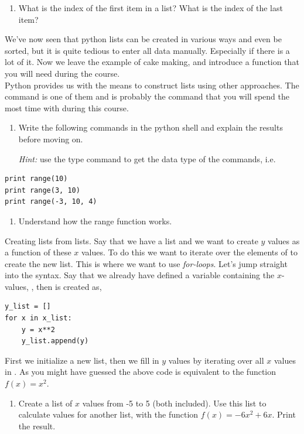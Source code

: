 \documentclass{article}
\begin{document}
\begin{enumerate}[resume]
  \item What is the index of the first item in a list? What is the index of
    the last item?

\end{enumerate}

We've now seen that python lists can be created in various ways and even be
sorted, but it is quite tedious to enter all data manually. Especially if
there is a lot of it. Now we leave the example of cake making, and introduce a function that you will need during the course. \\

Python provides us with the means to construct
lists using other approaches.
The  command is one of them and is probably the
command that you will spend the most time with during this course.

\begin{enumerate}[resume]
  \item Write the following commands in the python shell and explain the results
    before moving on.

    {\em Hint:} use the type command to get the data type of the commands,
    i.e. 
\end{enumerate}


\begin{lstlisting}
print range(10)
print range(3, 10)
print range(-3, 10, 4)
\end{lstlisting}

\begin{enumerate}[resume]
 \item Understand how the range function works.
\end{enumerate}


Creating lists from lists. Say that we have a list 
and we want to create $y$ values as a function of these $x$ values.
To do this we want to iterate over the elements of  to create the new list.
This is where we want to use {\em for-loops}.
Let's jump straight into the syntax. Say that we already
have defined a variable containing the $x$-values, ,
then  is created as,

\begin{lstlisting}
y_list = []
for x in x_list:
    y = x**2
    y_list.append(y)
\end{lstlisting}

First we initialize a new list,
then we fill in $y$ values by iterating over
all $x$ values in .
As you might have guessed the above code is equivalent to 
the function $f(x) = x^2$.\\
\begin{enumerate}[resume]
  \item Create a list of $x$ values from -5 to 5 (both included). Use this list
    to calculate values for another list, with the function $f(x) = -6x^2 + 6x$.
    Print the result.
\end{enumerate}
\end{document}
